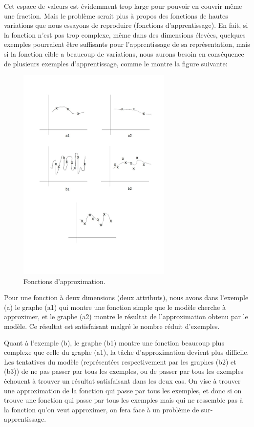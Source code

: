 	Cet espace de valeurs est évidemment trop large pour pouvoir en couvrir même une fraction. Mais le problème serait plus à propos des fonctions de hautes variations que nous essayons de reproduire (fonctions d'apprentissage). En fait, si la fonction n'est pas trop complexe, même dans des dimensions élevées, quelques exemples pourraient être suffisants pour l'apprentissage de sa représentation, mais si la fonction cible a beaucoup de variations, nous aurons besoin en conséquence de plusieurs exemples d'apprentissage, comme le montre la figure suivante:

\begin{figure}[H]
	\centering
		\includegraphics[width=3in]{Figures/highVariation.jpg}
	\caption[FA]{Fonctions d'approximation.}
	\label{fig:Electron}
\end{figure}


	Pour une fonction à deux dimensions (deux attributs), nous avons dans l'exemple (a) le graphe (a1) qui montre une fonction simple que le modèle cherche à approximer, et le graphe (a2) montre le résultat de l'approximation obtenu par le modèle. Ce résultat est satisfaisant malgré le nombre réduit d'exemples.

	Quant à l'exemple (b), le graphe (b1) montre une fonction beaucoup plus complexe que celle du graphe (a1), la tâche d'approximation devient plus difficile. Les tentatives du modèle (représentées respectivement par les graphes (b2) et (b3)) de ne pas passer par tous les exemples, ou de passer par tous les exemples échouent à trouver un résultat satisfaisant dans les deux cas. On vise à trouver une approximation de la fonction qui passe par tous les exemples, et donc si on trouve une fonction qui passe par tous les exemples mais qui ne ressemble pas à la fonction qu'on veut approximer, on fera face à un problème de sur-apprentissage.

